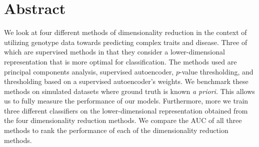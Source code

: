 \documentclass{article}
\begin{document}

\section{Abstract}
We look at four different methods of dimensionality reduction in the context of utilizing genotype data towards predicting complex traits and disease. Three of which are supervised methods in that they consider a lower-dimensional representation that is more optimal for classification. The methods used are principal components analysis, supervised autoencoder, $p$-value thresholding, and thresholding based on a supervised autoencoder's weights. We benchmark these methods on simulated datasets where ground truth is known \emph{a priori.} This allows us to fully measure the performance of our models. Furthermore, more we train three different classifiers on the lower-dimensional representation obtained from the four dimensionality reduction methods. We compare the AUC of all three methods to rank the performance of each of the dimensionality reduction methods.
\end{document}
